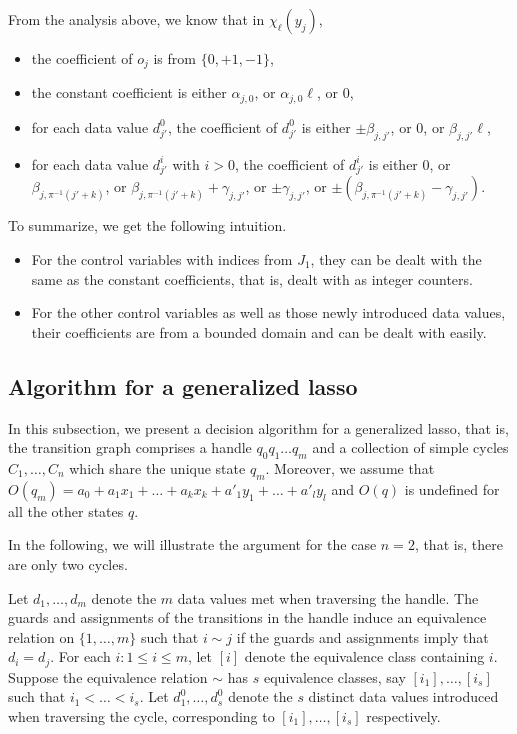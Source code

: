 \documentclass[runningheads,a4paper]{llncs}
\begin{document}
From the analysis above, we know that in $\chi_\ell(y_j)$, 
\begin{itemize}
\item the coefficient of $o_j$ is from $\{0,+1,-1\}$, 
%
\item the constant coefficient is either $\alpha_{j,0}$, or $\alpha_{j,0} \ell$, or $0$, 
%
\item for each data value $d^0_{j'}$, the coefficient of $d^0_{j'}$ is either $\pm \beta_{j,j'}$, or $0$, or $\beta_{j,j'} \ell$,
%
\item for each data value $d^i_{j'}$ with $i > 0$, the coefficient of $d^i_{j'}$ is either $0$, or $\beta_{j, \pi^{-1}(j'+k)}$, or $\beta_{j, \pi^{-1}(j'+k)}+\gamma_{j,j'}$, or $\pm \gamma_{j,j'}$, or $\pm(\beta_{j, \pi^{-1}(j'+k)}-\gamma_{j,j'})$.
\end{itemize}

To summarize, we get the following intuition.
\begin{itemize}
\item For the control variables with indices from $J_1$, they can be dealt with the same as the constant coefficients, that is, dealt with as integer counters.

\item For the other control variables as well as those newly introduced data values, their coefficients are from a bounded domain and can be dealt with easily.
\end{itemize}

\subsection{Algorithm for a generalized lasso}

In this subsection, we present a decision algorithm for a generalized lasso, that is, the transition graph comprises a handle $q_0 q_1 \dots q_m$ and a collection of simple cycles $C_1,\dots,C_n$ which share the unique state $q_m$. Moreover, we assume that $O(q_m) = a_0 + a_1 x_1 + \dots + a_k x_k + a'_1 y_1 + \dots + a'_l y_l$ and $O(q)$ is undefined for all the other states $q$.

In the following, we will illustrate the argument for the case $n=2$, that is, there are only two cycles.

Let $d_1,\dots, d_m$ denote the $m$ data values met when traversing the handle. The guards and assignments of the transitions in the handle induce an equivalence relation on $\{1,\dots,m\}$ such that $i \sim j$ if the guards and assignments imply that $d_i = d_j$. For each $i: 1\le i \le m$, let $[i]$ denote the equivalence class containing $i$. Suppose the equivalence relation $\sim$ has $s$ equivalence classes, say $[i_1],\dots,[i_s]$ such that $i_1 < \dots < i_s$. Let $d^0_1,\dots,d^0_{s}$ denote the $s$ distinct data values introduced when traversing the cycle, corresponding to $[i_1],\dots,[i_s]$ respectively. 
\end{document}

